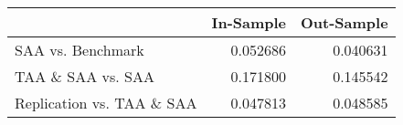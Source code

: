\begin{tabular}{lrr}
\toprule
{} &  In-Sample &  Out-Sample \\
\midrule
SAA vs. Benchmark          &   0.052686 &    0.040631 \\
TAA \& SAA vs. SAA          &   0.171800 &    0.145542 \\
Replication vs. TAA \& SAA  &   0.047813 &    0.048585 \\
\bottomrule
\end{tabular}
